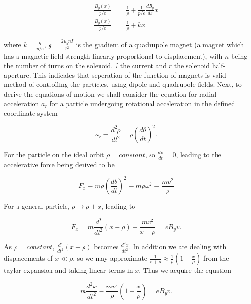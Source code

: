 \begin{align}
\frac{B_{y} \left( x \right)}{p/e} &= \frac{1}{\rho} + \frac{1}{p/e}\frac{dB_{y}}{dx} x \\
\frac{B_{y} \left( x \right)}{p/e} &= \frac{1}{\rho} + k x
\end{align}

where $k = \frac{g}{p/e}$, $g=\frac{2\mu_{0}nI}{r^{2}}$ is the gradient of a quadrupole magnet (a magnet which has a magnetic field strength linearly proportional to displacement), with $n$ being the number of turns on the solenoid, $I$ the current and $r$ the solenoid half-aperture. This indicates that seperation of the function of magnets is valid method of controlling the particles, using dipole and quadrupole fields. Next, to derive the equations of motion we shall consider the equation for radial acceleration $a_{r}$ for a particle undergoing rotational acceleration in the defined coordinate system

\begin{equation}
a_{r} = \frac{d^{2}\rho}{dt^{2}} - \rho \left( \frac{d\theta}{dt} \right)^{2}.
\end{equation}

For the particle on the ideal orbit $\rho = constant$, so $\frac{d \rho}{dt} = 0$, leading to the accelerative force being derived to be

\begin{equation}
F_{x} = m \rho \left( \frac{d\theta}{dt} \right)^{2} = m\rho \omega^{2} = \frac{mv^{2}}{\rho}
\end{equation} 

For a general particle, $\rho \rightarrow \rho + x$, leading to

\begin{equation}
F_{x} = m\frac{d^{2}}{dt^{2}} \left( x+ \rho \right) - \frac{mv^{2}}{x + \rho} = eB_{y} v.
\end{equation}

As $\rho = constant$, $\frac{d^{2}}{dt^{2}} ( x+ \rho )$ becomes $\frac{d^{2}x}{dt^{2}}$. In addition we are dealing with displacements of $x \ll \rho$, so we may approximate $\frac{1}{x+\rho} \approx \frac{1}{\rho}(1-\frac{x}{\rho})$ from the taylor expansion and taking linear terms in $x$. Thus we acquire the equation

\begin{equation}
 m\frac{d^{2}x}{dt^{2}}  - \frac{mv^{2}}{\rho}\left( 1 - \frac{x}{\rho} \right) = eB_{y} v.
\end{equation}

